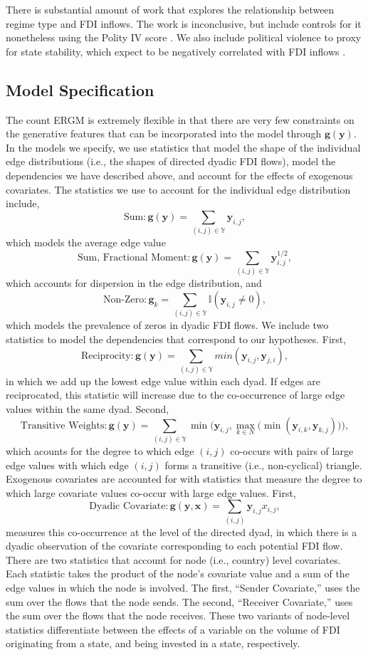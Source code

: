 \documentclass{article}
\begin{document}
There is substantial amount of work that explores the relationship between regime type and FDI inflows. The work is inconclusive, but include controls for it nonetheless using the Polity IV score \citep{polity2012polity}. We also include political violence to proxy for state stability, which expect to be negatively correlated with FDI inflows \citep{marshall2005major}.

\subsection{Model Specification}
The count ERGM is extremely flexible in that there are very few constraints on the generative features that can be incorporated into the model through $\bm{g}( \bm{y} )$. In the models we specify, we use statistics that model the shape of the individual edge distributions (i.e., the shapes of directed dyadic FDI flows), model the dependencies we have described above, and account for the effects of exogenous covariates. The statistics we use to account for the individual edge distribution include, $$\text{Sum}:\bm{g(y)} = \sum_{(i,j) {\in} \mathbb{Y}}\bm{y}_{i,j},$$ which models the average edge value $$\text{Sum, Fractional Moment}:\bm{g(y)} = \sum_{(i,j) {\in} \mathbb{Y}}\bm{y}_{i,j}^{1/2},$$ which accounts for dispersion in the edge distribution, and
$$\text{Non-Zero}: \bm{g}_k = \sum_{(i,j) {\in} \mathbb{Y}} \mathbb{I}(\bm{y}_{i,j} \neq 0),$$ which models the prevalence of zeros in dyadic FDI flows. We include two statistics to model the dependencies that correspond to our hypotheses. First,
$$ \text{Reciprocity}: \bm{g(y)} = \sum_{(i,j) {\in} \mathbb{Y}}min(\bm{y}_{i,j},\bm{y}_{j,i}),$$ in which we add up the lowest edge value within each dyad. If edges are reciprocated, this statistic will increase due to the co-occurrence of large edge values within the same dyad. Second, 
$$\text{Transitive Weights}: \bm{g(y)} =  \sum_{(i,j) {\in} \mathbb{Y}}\min\bigg( \bm{y}_{i,j}, \max\limits_{k{\in}N}\Big(\min(\bm{y}_{i,k},\bm{y}_{k,j})\Big) \bigg),$$ which acounts for the degree to which edge $(i,j)$ co-occurs with pairs of large edge values with which  edge $(i,j)$ forms a transitive (i.e., non-cyclical) triangle. Exogenous covariates are accounted for with statistics that measure the degree to which large covariate values co-occur with large edge values. First,
$$ \text{Dyadic Covariate}: \bm{g(y,x)} = \sum_{(i,j)} \bm{y}_{i,j}x_{i,j},$$ measures this co-occurrence at the level of the directed dyad, in which there is a dyadic observation of the covariate corresponding to each potential FDI flow. There are two statistics that account for node (i.e., country) level covariates. Each statistic takes the product of the node's covariate value and a sum of the edge values in which the node is involved. The first, ``Sender Covariate,'' uses the sum over the flows that the node sends. The second, ``Receiver Covariate,'' uses the sum over the flows that the node receives. These two variants of node-level statistics differentiate between the effects of a variable on the volume of FDI originating from a state, and being invested in a state, respectively.
\end{document}
